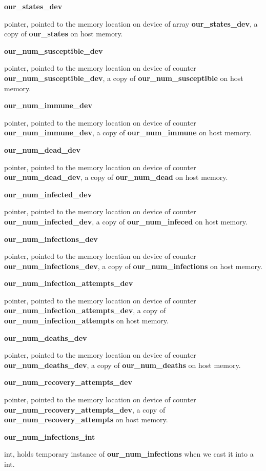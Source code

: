 \documentclass[letterpaper,10pt,openany,oneside]{sphinxmanual}
\begin{document}
\textbf{our\_states\_dev}

pointer, pointed to the memory location on device of array \textbf{our\_states\_dev}, a copy of \textbf{our\_states} on host memory.

\textbf{our\_num\_susceptible\_dev}

pointer, pointed to the memory location on device of counter \textbf{our\_num\_susceptible\_dev}, a copy of \textbf{our\_num\_susceptible} on host memory.

\textbf{our\_num\_immune\_dev}

pointer, pointed to the memory location on device of counter \textbf{our\_num\_immune\_dev}, a copy of \textbf{our\_num\_immune} on host memory.

\textbf{our\_num\_dead\_dev}

pointer, pointed to the memory location on device of counter \textbf{our\_num\_dead\_dev}, a copy of \textbf{our\_num\_dead} on host memory.

\textbf{our\_num\_infected\_dev}

pointer, pointed to the memory location on device of counter \textbf{our\_num\_infected\_dev}, a copy of \textbf{our\_num\_infeced} on host memory.

\textbf{our\_num\_infections\_dev}

pointer, pointed to the memory location on device of counter \textbf{our\_num\_infections\_dev}, a copy of \textbf{our\_num\_infections} on host memory.

\textbf{our\_num\_infection\_attempts\_dev}

pointer, pointed to the memory location on device of counter \textbf{our\_num\_infection\_attempts\_dev}, a copy of \textbf{our\_num\_infection\_attempts} on host memory.

\textbf{our\_num\_deaths\_dev}

pointer, pointed to the memory location on device of counter \textbf{our\_num\_deaths\_dev}, a copy of \textbf{our\_num\_deaths} on host memory.

\textbf{our\_num\_recovery\_attempts\_dev}

pointer, pointed to the memory location on device of counter \textbf{our\_num\_recovery\_attempts\_dev}, a copy of \textbf{our\_num\_recovery\_attempts} on host memory.

\textbf{our\_num\_infections\_int}

int, holds temporary instance of \textbf{our\_num\_infections} when we cast it into a int.
\end{document}

